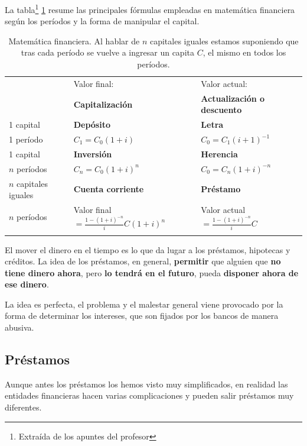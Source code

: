 \documentclass[nochap,palatino,shortheader]{apuntes}
\newcommand{\study}[1]{#1} \newcommand{\substudy}[1]{#1}
\begin{document}
La tabla\footnote{Extraída de los apuntes del profesor} \ref{tab:MatFinan} resume las principales fórmulas empleadas en matemática financiera según los períodos y la forma de manipular el capital.

\begin{table}[hbtp]
\centering
\begin{tabular}{l|p{6cm}|p{5cm}|}
& Valor final:  & Valor actual:  \\
& \textbf{Capitalización} & \textbf{Actualización o descuento} \\
\hline
1 capital & \textbf{Depósito} & \textbf{Letra}\\
1 período & $C_1=C_0(1+i)$ & $C_0=C_1(i+1)^{-1}$\\
\hline
1 capital & \textbf{Inversión} & \textbf{Herencia}\\
$n$ períodos & $C_n=C_0(1+i)^n$ & $C_0=C_n(1+i)^{-n}$ \\
\hline
$n$ capitales iguales & \textbf{Cuenta corriente} & \textbf{Préstamo}\\
$n$ períodos & Valor final$=\displaystyle\frac{1-(1+i)^{-n}}{i}C(1+i)^n$ & Valor actual$=\displaystyle\frac{1-(1+i)^{-n}}{i}C$ \\
&&\\
\hline
\end{tabular}
\caption{\study{Matemática financiera}. Al hablar de $n$ capitales iguales estamos suponiendo que tras cada período se vuelve a ingresar un capita $C$, el mismo en todos los períodos.}
\label{tab:MatFinan}
\end{table}

El mover el dinero en el tiempo es lo que da lugar a los préstamos, hipotecas y créditos. La idea de los préstamos, en general, \textbf{permitir} que alguien que \textbf{no tiene dinero ahora}, pero \textbf{lo tendrá en el futuro}, pueda \textbf{disponer ahora de ese dinero}.

La idea es perfecta, el problema y el malestar general viene provocado por la forma de determinar los intereses, que son fijados por los bancos de manera abusiva.


\subsection{Préstamos}

Aunque antes los préstamos los hemos visto muy simplificados, en realidad las entidades financieras hacen varias complicaciones y pueden salir préstamos muy diferentes.
\end{document}
